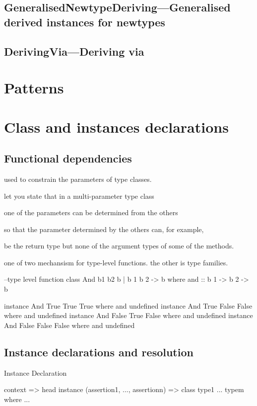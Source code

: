 \documentclass[openany, 12pt]{book}
\begin{document}
\chapter{GeneralisedNewtypeDeriving---Generalised derived instances for newtypes}

\setcounter{chapter}{7}
\chapter{DerivingVia---Deriving via}

\part{Patterns}
\part{Class and instances declarations}

\setcounter{chapter}{6}
\chapter{Functional dependencies}
\begin{alist}
	\item used to constrain the parameters of type classes.
	\item let you state that in a multi-parameter type class
	\item one of the parameters can be determined from the others
	\item so that the parameter determined by the others can, for example,
	\item be the return type but none of the argument types of some of the methods.
	\item one of two mechansism for type-level functions. the other is type
	families.
\end{alist}

\begin{haskell}{}
--type level function
class And b1 b2 b | b 1 b 2 -> b where
    and :: b 1 -> b 2 -> b

instance And True True True    where and undefined
instance And True False False  where and undefined
instance And False True False  where and undefined
instance And False False False where and undefined
\end{haskell}

\chapter{Instance declarations and resolution}
\begin{definition}{Instance Declaration}{}
	\begin{haskell}{}
                               context => head
instance (assertion1, ..., assertionn) => class type1 ... typem where ...
    \end{haskell}
\end{definition}
\end{document}
